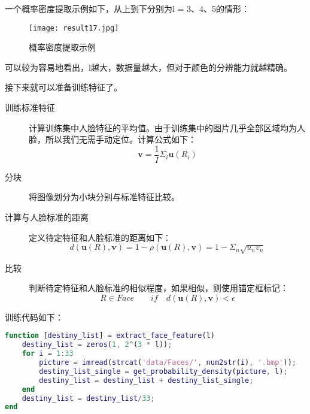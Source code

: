 \documentclass[a4paper]{article}
\begin{document}
\par 一个概率密度提取示例如下，从上到下分别为l = 3、4、5的情形：

\begin{figure}[ht]
    \centering
    \texttt{[image: result17.jpg]}
    \caption{概率密度提取示例}
    \label{fig:result 17}
\end{figure}

\par 可以较为容易地看出，l越大，数据量越大，但对于颜色的分辨能力就越精确。

\par 接下来就可以准备训练特征了。
\begin{description}
    \item [训练标准特征] 
    计算训练集中人脸特征的平均值。由于训练集中的图片几乎全部区域均为人脸，所以我们无需手动定位。计算公式如下：
    \begin{equation}
        \mathbf{v} = \frac{1}{I}\Sigma_i\mathbf{u}(R_i)
    \end{equation}
    \item [分块]
    将图像划分为小块分别与标准特征比较。
    \item [计算与人脸标准的距离]
    定义待定特征和人脸标准的距离如下：
    \begin{equation}
        d(\mathbf{u}(R),\mathbf{v}) = 1 - \rho(\mathbf{u}(R),\mathbf{v}) = 1 - \Sigma_n\sqrt{u_n v_n}
    \end{equation}
    \item [比较]
    判断待定特征和人脸标准的相似程度，如果相似，则使用锚定框标记：
    \begin{equation}
        R\in Face \quad \quad if \quad d(\mathbf{u}(R),\mathbf{v}) < \epsilon
    \end{equation}
\end{description}

\par 训练代码如下：
\begin{lstlisting}[language=matlab, caption=特征提取]
function [destiny_list] = extract_face_feature(l)
    destiny_list = zeros(1, 2^(3 * l));
    for i = 1:33
        picture = imread(strcat('data/Faces/', num2str(i), '.bmp'));
        destiny_list_single = get_probability_density(picture, l);
        destiny_list = destiny_list + destiny_list_single;
    end
    destiny_list = destiny_list/33;
end
\end{lstlisting}
\end{document}
